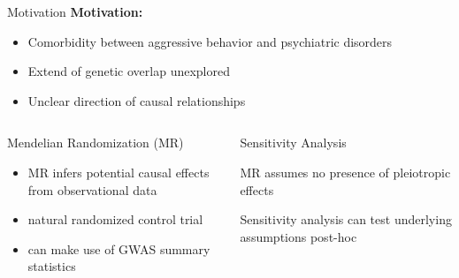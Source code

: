 \documentclass{beamer}
\begin{document}
\begin{frame}[t]{Motivation}
  \small
  \textbf{Motivation:}
  \begin{itemize}
    \item Comorbidity between aggressive behavior and psychiatric disorders 
    \item Extend of genetic overlap unexplored
    \item Unclear direction of causal relationships
  \end{itemize}
  \begin{columns}[T]
    \begin{column}[T]{0.5\textwidth}
      \begin{block}{\small Mendelian Randomization (MR)}
        \begin{itemize}
          \item MR infers potential causal effects from observational data 
          \item natural randomized control trial
          \item can make use of GWAS summary statistics
        \end{itemize}
     \end{block} 
    \end{column}
    \begin{column}[T]{0.5\textwidth}
      \begin{block}{\small Sensitivity Analysis}
      \item MR assumes no presence of pleiotropic effects
      \item Sensitivity analysis can test underlying assumptions post-hoc
      \end{block}
    \end{column}
  \end{columns}
\end{frame}
\end{document}
